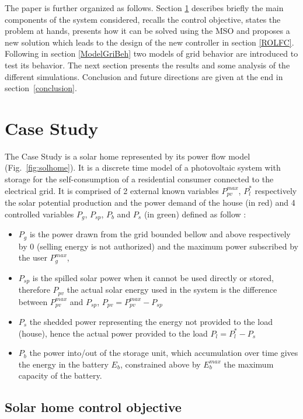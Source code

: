 \documentclass[conference]{IEEEtran}
\begin{document}
The paper is further organized as follows. Section \ref{CaseStudy} describes briefly the main components of the system considered, recalls the control objective, states the problem at hands, presents how it can be solved using the MSO and proposes a new solution which leads to the design of the new controller in section \ref{ROLFC}. Following in section \ref{ModelGriBeh} two models of grid behavior are introduced to test its behavior.  The next section presents the results and some analysis of the different simulations. Conclusion and future directions are given at the end in section~\ref{conclusion}.


\section{Case Study}\label{CaseStudy}

\quad The Case Study is a solar home represented by its power flow model (Fig.~\ref{fig:solhome}). It is a discrete time model of a photovoltaic system with storage for the self-consumption of a residential consumer connected to the electrical grid. It is comprised of 2 external known variables $P_{pv}^{max}$, $P_l^*$ respectively the solar potential production  and the power demand of the house (in red) and 4 controlled variables $P_g$, $P_{sp}$, $P_b$ and $P_s$ (in green) defined as follow : 
\begin{itemize}
\item $P_g$ is the power drawn from the grid bounded bellow and above
respectively by 0 (selling energy is not authorized) and the maximum power subscribed by the user $P_g^{max}$,
\item $P_{sp}$ is the spilled solar power when it cannot be used directly or stored, therefore $P_{pv}$ the actual solar 
energy used in the system is the difference between $P_{pv}^{max}$ and $P_{sp}$, $P_{pv} = P_{pv}^{max}-P_{sp}$
\item $P_s$ the shedded power representing the energy not provided to the load (house), hence the actual power provided to the load $P_l = P_l^* - P_s$
\item $P_b$ the power into/out of the storage unit, which accumulation over time gives the energy in the battery $E_b$, constrained above by $E_b^{max}$ the maximum capacity of the battery. 
\end{itemize}
\subsection{Solar home control objective }
\end{document}
